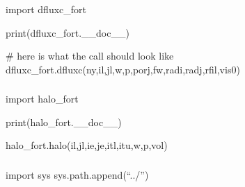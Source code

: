 \documentclass[letterpaper,10pt,english]{sphinxmanual}
\begin{document}
\subsubsection{}
\label{\detokenize{autoapi/tests/test_dfluxc/index:module-tests.test_dfluxc}}\label{\detokenize{autoapi/tests/test_dfluxc/index:tests-test-dfluxc}}\label{\detokenize{autoapi/tests/test_dfluxc/index::doc}}
\sphinxAtStartPar
import dfluxc\_fort

\sphinxAtStartPar
print(dfluxc\_fort.\_\_doc\_\_)

\sphinxAtStartPar
\# here is what the call should look like
dfluxc\_fort.dfluxc(ny,il,jl,w,p,porj,fw,radi,radj,rfil,vis0)


\subsubsection{}
\label{\detokenize{autoapi/tests/test_eflux/index:module-tests.test_eflux}}\label{\detokenize{autoapi/tests/test_eflux/index:tests-test-eflux}}\label{\detokenize{autoapi/tests/test_eflux/index::doc}}

\subsubsection{}
\label{\detokenize{autoapi/tests/test_halo/index:module-tests.test_halo}}\label{\detokenize{autoapi/tests/test_halo/index:tests-test-halo}}\label{\detokenize{autoapi/tests/test_halo/index::doc}}
\sphinxAtStartPar
import halo\_fort

\sphinxAtStartPar
print(halo\_fort.\_\_doc\_\_)

\sphinxAtStartPar
halo\_fort.halo(il,jl,ie,je,itl,itu,w,p,vol)


\subsubsection{}
\label{\detokenize{autoapi/tests/test_nsflux/index:module-tests.test_nsflux}}\label{\detokenize{autoapi/tests/test_nsflux/index:tests-test-nsflux}}\label{\detokenize{autoapi/tests/test_nsflux/index::doc}}
\sphinxAtStartPar
import sys
sys.path.append(“../”)
\end{document}

